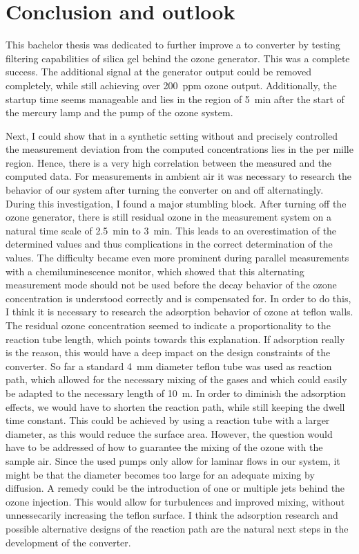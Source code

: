\section{Conclusion and outlook}
\label{sec:conclusion}

This bachelor thesis was dedicated to further improve a  to
 converter by testing filtering capabilities of silica gel
behind the ozone generator. This was a complete success. The
additional  signal at the generator output could be removed
completely, while still achieving over \SI{200}{ppm} ozone
output. Additionally, the startup time seems manageable and lies in the
region of \SI{5}{\minute} after the start of the mercury lamp and the
pump of the ozone system. 

Next, I could show that in a synthetic setting without  and
precisely controlled  the measurement deviation from the
computed  concentrations lies in the per mille region. Hence,
there is a very high correlation between the measured and the computed
data. For measurements in ambient air it was necessary to research the
behavior of our system after turning the converter on and off
alternatingly. During this investigation, I found a major stumbling
block. After turning off the ozone generator, there is still residual
ozone in the measurement system on a natural time scale of
\SI{2.5}{\minute} to \SI{3}{\minute}. This leads to an overestimation
of the determined  values and thus complications in the
correct determination of the  values. The difficulty became
even more prominent during parallel measurements with a
chemiluminescence monitor, which showed that this alternating
measurement mode should not be used before the decay behavior of the
ozone concentration is understood correctly and is compensated for. In
order to do this, I think it is necessary to research the adsorption
behavior of ozone at teflon walls. The residual ozone concentration
seemed to indicate a proportionality to the reaction tube length,
which points towards this explanation. If adsorption really is the
reason, this would have a deep impact on the design constraints of the
converter. So far a standard \SI{4}{\milli\meter} diameter teflon tube
was used as reaction path, which allowed for the necessary mixing of
the gases and which could easily be adapted to the necessary length of
\SI{10}{\meter}. In order to diminish the adsorption effects, we would
have to shorten the reaction path, while still keeping the dwell time
constant. This could be achieved by using a reaction tube with a
larger diameter, as this would reduce the surface area. However, the
question would have to be addressed of how to guarantee the mixing of
the ozone with the sample air. Since the used pumps only allow for
laminar flows in our system, it might be that the diameter becomes too
large for an adequate mixing by diffusion. A remedy could be the
introduction of one or multiple jets behind the ozone injection. This
would allow for turbulences and improved mixing, without unnessecarily
increasing the teflon surface. I think the adsorption research and
possible alternative designs of the reaction path are the natural next
steps in the development of the converter.

